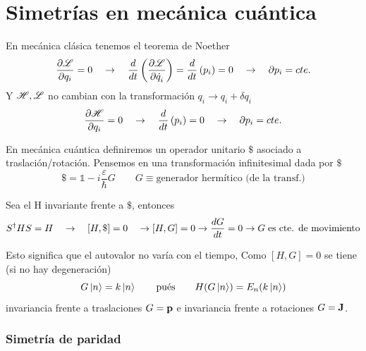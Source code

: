 \documentclass[10pt,oneside]{CBFT_book}
\begin{document}
\chapter{Simetrías en mecánica cuántica}

En mecánica clásica tenemos el teorema de Noether 
\[
	\frac{\partial^{\hspace{-0.05em}} {\mathscr{L}}}{\partial {q_i}^{\hspace{-0.05em}}} = 0 \quad \to \quad \frac{d^{\hspace{-0.05em}} {}}{d {t}^{\hspace{-0.05em}}}\left( \frac{\partial^{\hspace{-0.05em}} {\mathscr{L}}}{\partial {\dot{q}_i}^{\hspace{-0.05em}}} \right) = 
	\frac{d^{\hspace{-0.05em}} {}}{d {t}^{\hspace{-0.05em}}}\left( p_i \right) = 0 \quad \rightarrow \quad \partial p_i = cte.
\]
Y $\mathscr{H}, \mathscr{L}$ no cambian con la transformación $q_i \longrightarrow q_i + \delta q_i$
\[
	\frac{\partial^{\hspace{-0.05em}} {\mathscr{H}}}{\partial {q_i}^{\hspace{-0.05em}}} = 0 \quad \to \quad  
	\frac{d^{\hspace{-0.05em}} {}}{d {t}^{\hspace{-0.05em}}}\left( p_i \right) = 0 \quad \rightarrow \quad \partial p_i = cte. 
\]

En mecánica cuántica definiremos un operador unitario $\$$ asociado a traslación/rotación. Pensemos en una 
transformación infinitesimal dada por $\$$
\[
	\mathbb{\$} = \mathbb{1} - i\frac{\varepsilon}{\hbar}G \qquad G \equiv \text{generador hermítico (de 
la transf.)}
\]

Sea el H invariante frente a $\$$, entonces 
\[
	S^\dagger HS = H \quad  \rightarrow \quad [H,\$] = 0 \quad \rightarrow [H,G]=0 \rightarrow
	\frac{d^{\hspace{-0.05em}} {G}}{d {t}^{\hspace{-0.05em}}} = 0 \rightarrow G \;\text{es cte. de movimiento}
\]

Esto significa que el autovalor no varía con el tiempo, Como $[H,G]=0$ se tiene (si no hay degeneración)
\[
	G\Ket{n} = k\Ket{n} \qquad \text{pués} \qquad H(G\Ket{n}) = E_n(k\Ket{n})
\]
invariancia frente a traslaciones $G=\vb{p}$ e invariancia frente a rotaciones $G=\vb{J}$.

\subsection{Simetría de paridad}
\end{document}
